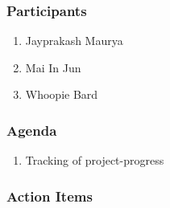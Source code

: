 \documentclass{article}%
\begin{document}
%
\hypertarget{ID:1927059848}{}%
\subsubsection{Participants}%

%
\par%
\begin{enumerate}%
\item%
\hypertarget{ID:326064087}{}%
Jayprakash Maurya%
\par%
\item%
\hypertarget{ID:163396610}{}%
Mai In Jun%
\par%
\item%
\hypertarget{ID:1196998770}{}%
Whoopie Bard%
\par%
\end{enumerate}%
\hypertarget{ID:288892622}{}%
\subsubsection{Agenda}%

%
\par%
\begin{enumerate}%
\item%
\hypertarget{ID:1061016650}{}%
Tracking of project{-}progress%
\par%
\end{enumerate}%
\hypertarget{ID:899876949}{}%
\subsubsection{Action Items}%
\end{document}
